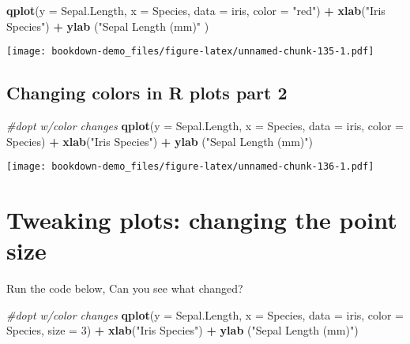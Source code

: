 \documentclass[]{book}
\newenvironment{Shaded}{\begin{snugshade}}{\end{snugshade}}
\newcommand{\KeywordTok}[1]{\textcolor[rgb]{0.13,0.29,0.53}{\textbf{#1}}}
\newcommand{\DataTypeTok}[1]{\textcolor[rgb]{0.13,0.29,0.53}{#1}}
\newcommand{\DecValTok}[1]{\textcolor[rgb]{0.00,0.00,0.81}{#1}}
\newcommand{\StringTok}[1]{\textcolor[rgb]{0.31,0.60,0.02}{#1}}
\newcommand{\CommentTok}[1]{\textcolor[rgb]{0.56,0.35,0.01}{\textit{#1}}}
\newcommand{\OperatorTok}[1]{\textcolor[rgb]{0.81,0.36,0.00}{\textbf{#1}}}
\newcommand{\NormalTok}[1]{#1}
\theoremstyle{definition}
\theoremstyle{definition}
\theoremstyle{definition}
\theoremstyle{remark}
\begin{document}
\begin{Shaded}
\begin{Highlighting}[]
\KeywordTok{qplot}\NormalTok{(}\DataTypeTok{y =}\NormalTok{ Sepal.Length,}
      \DataTypeTok{x =}\NormalTok{ Species,    }
        \DataTypeTok{data =}\NormalTok{ iris,}
      \DataTypeTok{color =} \StringTok{"red"}\NormalTok{) }\OperatorTok{+}
\StringTok{  }\KeywordTok{xlab}\NormalTok{(}\StringTok{"Iris Species"}\NormalTok{) }\OperatorTok{+}\StringTok{  }
\StringTok{  }\KeywordTok{ylab}\NormalTok{ (}\StringTok{"Sepal Length (mm)"}\NormalTok{ )}
\end{Highlighting}
\end{Shaded}

\texttt{[image: bookdown-demo\_files/figure-latex/unnamed-chunk-135-1.pdf]}

\subsection{Changing colors in R plots part
2}\label{changing-colors-in-r-plots-part-2}

\begin{Shaded}
\begin{Highlighting}[]
\CommentTok{#dopt w/color changes}
\KeywordTok{qplot}\NormalTok{(}\DataTypeTok{y =}\NormalTok{ Sepal.Length,}
      \DataTypeTok{x =}\NormalTok{ Species,    }
        \DataTypeTok{data =}\NormalTok{ iris,}
      \DataTypeTok{color =}\NormalTok{ Species) }\OperatorTok{+}
\StringTok{  }\KeywordTok{xlab}\NormalTok{(}\StringTok{"Iris Species"}\NormalTok{) }\OperatorTok{+}\StringTok{  }
\StringTok{  }\KeywordTok{ylab}\NormalTok{ (}\StringTok{"Sepal Length (mm)"}\NormalTok{)}
\end{Highlighting}
\end{Shaded}

\texttt{[image: bookdown-demo\_files/figure-latex/unnamed-chunk-136-1.pdf]}

\section{Tweaking plots: changing the point
size}\label{tweaking-plots-changing-the-point-size}

Run the code below, Can you see what changed?

\begin{Shaded}
\begin{Highlighting}[]
\CommentTok{#dopt w/color changes}
\KeywordTok{qplot}\NormalTok{(}\DataTypeTok{y =}\NormalTok{ Sepal.Length,}
      \DataTypeTok{x =}\NormalTok{ Species,    }
        \DataTypeTok{data =}\NormalTok{ iris,}
      \DataTypeTok{color =}\NormalTok{ Species,}
      \DataTypeTok{size =} \DecValTok{3}\NormalTok{) }\OperatorTok{+}
\StringTok{  }\KeywordTok{xlab}\NormalTok{(}\StringTok{"Iris Species"}\NormalTok{) }\OperatorTok{+}\StringTok{  }
\StringTok{  }\KeywordTok{ylab}\NormalTok{ (}\StringTok{"Sepal Length (mm)"}\NormalTok{)}
\end{Highlighting}
\end{Shaded}
\end{document}

